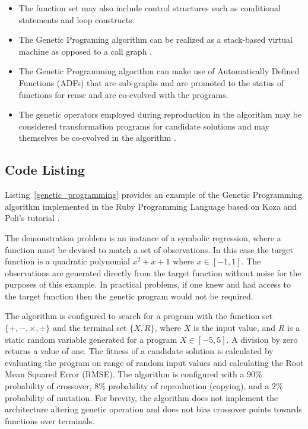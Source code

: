 \begin{itemize}
	\item The function set may also include control structures such as conditional statements and loop constructs.
	\item The Genetic Programing algorithm can be realized as a stack-based virtual machine as opposed to a call graph \cite{Perkis1994}.
	\item The Genetic Programming algorithm can make use of Automatically Defined Functions (ADFs) that are sub-graphs and are promoted to the status of functions for reuse and are co-evolved with the programs. 
	 \item The genetic operators employed during reproduction in the algorithm may be considered transformation programs for candidate solutions and may themselves be co-evolved in the algorithm \cite{Angeline1996}.
\end{itemize}

\subsection{Code Listing}
Listing~\ref{genetic_programming} provides an example of the Genetic Programming algorithm implemented in the Ruby Programming Language based on Koza and Poli's tutorial \cite{Koza2005}.
 
The demonstration problem is an instance of a symbolic regression, where a function must be devised to match a set of observations. In this case the target function is a quadratic polynomial $x^2+x+1$ where $x \in [-1,1]$. The observations are generated directly from the target function without noise for the purposes of this example. In practical problems, if one knew and had access to the target function then the genetic program would not be required.

The algorithm is configured to search for a program with the function set $\{ +, -, \times, \div \}$ and the terminal set $\{ X, R \}$, where $X$ is the input value, and $R$ is a static random variable generated for a program $X \in [-5,5]$. A division by zero returns a value of one. 
The fitness of a candidate solution is calculated by evaluating the program on range of random input values and calculating the Root Mean Squared Error (RMSE).
The algorithm is configured with a 90\% probability of crossover, 8\% probability of reproduction (copying), and a 2\% probability of mutation.
For brevity, the algorithm does not implement the architecture altering genetic operation and does not bias crossover points towards functions over terminals.

